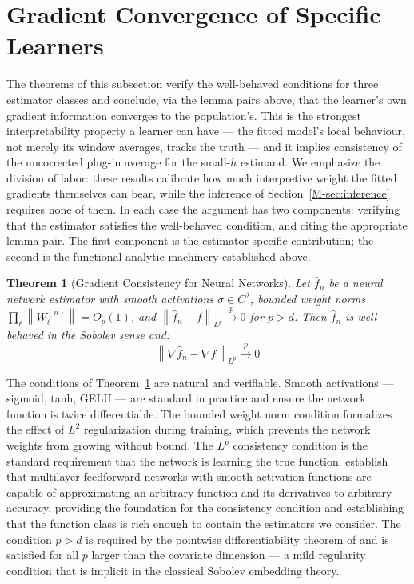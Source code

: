 \documentclass[12pt,a4paper]{article}
\numberwithin{equation}{section}
\theoremstyle{plain}
\newtheorem{theorem}{Theorem}
\theoremstyle{definition}
\newcommand{\norm}[1]{\left\| #1 \right\|}
\newcommand{\fn}{\hat{f}_n}
\newcommand{\xrightarrowp}{\xrightarrow{p}}
\begin{document}
	\section{Gradient Convergence of Specific Learners}
	\label{sec:learners}
	
	The theorems of this subsection verify the well-behaved conditions for three
	estimator classes and conclude, via the lemma pairs above, that the learner's own
	gradient information converges to the population's. This is the strongest
	interpretability property a learner can have --- the fitted model's local behaviour,
	not merely its window averages, tracks the truth --- and it implies consistency of
	the uncorrected plug-in average for the small-$h$ estimand. We emphasize the
	division of labor: these results calibrate how much interpretive weight the fitted
	gradients themselves can bear, while the inference of Section~\ref{M-sec:inference}
	requires none of them. In each case the argument has two components: verifying that
	the estimator satisfies the well-behaved condition, and citing the appropriate
	lemma pair. The first component is the estimator-specific contribution; the second
	is the functional analytic machinery established above.
	
	\begin{theorem}[Gradient Consistency for Neural Networks]
		\label{thm:neural_nets}
		Let $\fn$ be a neural network estimator with smooth activations $\sigma \in C^2$,
		bounded weight norms $\prod_\ell \norm{W_\ell^{(n)}} = O_p(1)$, and
		$\norm{\fn - f}_{L^p} \xrightarrowp 0$ for $p > d$. Then $\fn$ is well-behaved in
		the Sobolev sense and:
		\begin{equation}
			\norm{\nabla \fn - \nabla f}_{L^p} \xrightarrowp 0
		\end{equation}
	\end{theorem}
	
	The conditions of Theorem~\ref{thm:neural_nets} are natural and verifiable. Smooth
	activations --- sigmoid, tanh, GELU --- are standard in practice and ensure the network
	function is twice differentiable. The bounded weight norm condition formalizes the
	effect of $L^2$ regularization during training, which prevents the network weights from
	growing without bound. The $L^p$ consistency condition is the standard requirement that
	the network is learning the true function. \citet{hornik1990universal} establish that
	multilayer feedforward networks with smooth activation functions are capable of
	approximating an arbitrary function and its derivatives to arbitrary accuracy, providing
	the foundation for the consistency condition and establishing that the function class is
	rich enough to contain the estimators we consider. The condition $p > d$ is required by
	the pointwise differentiability theorem of \citet[Theorem~6.5]{evans2015measure} and
	is satisfied for all $p$ larger than the covariate dimension --- a mild regularity
	condition that is implicit in the classical Sobolev embedding theory.
	
\end{document}
